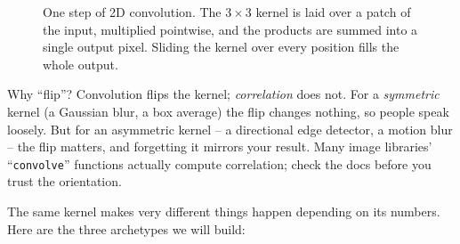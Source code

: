 \begin{figure}[H]
\centering
{}
\caption{One step of 2D convolution. The $3\times3$ kernel is laid over a patch of
the input, multiplied pointwise, and the products are summed into a single output
pixel. Sliding the kernel over every position fills the whole output.}
\label{ch31:fig-conv}
\end{figure}

\begin{walkbox}
Why ``flip''? Convolution flips the kernel; \emph{correlation} does not. For a
\emph{symmetric} kernel (a Gaussian blur, a box average) the flip changes nothing,
so people speak loosely. But for an asymmetric kernel -- a directional edge
detector, a motion blur -- the flip matters, and forgetting it mirrors your result.
Many image libraries' ``\texttt{convolve}'' functions actually compute
correlation; check the docs before you trust the orientation.
\end{walkbox}

The same kernel makes very different things happen depending on its numbers.
Here are the three archetypes we will build:

